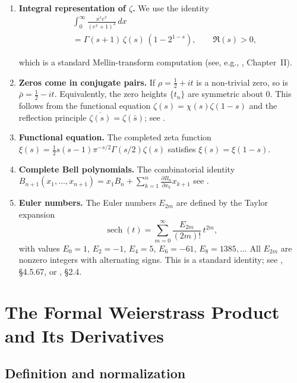 \documentclass[article]{article}
\theoremstyle{plain}
\theoremstyle{definition}
\DeclareMathOperator{\sech}{sech}
\begin{document}
\begin{enumerate}

\item \textbf{Integral representation of $\zeta$.}
We use the identity
\begin{align*}
& \int_0^\infty \frac{x^s e^x}{(e^x+1)^2}\,dx \\
&= \Gamma(s+1)\,\zeta(s)\,(1-2^{1-s}),\qquad \Re(s)>0,
\end{align*}

which is a standard Mellin-transform computation (see, e.g.,
\cite{Titchmarsh1986}, Chapter~II).

\item \textbf{Zeros come in conjugate pairs.}
If $\rho=\tfrac{1}{2}+it$ is a non-trivial zero, so is $\bar\rho=\tfrac{1}{2}-it$.
Equivalently, the zero heights $\{t_n\}$ are symmetric about $0$.
This follows from the functional equation $\zeta(s)=\chi(s)\zeta(1-s)$ and the
reflection principle $\overline{\zeta(s)}=\zeta(\bar s)$; see
\cite{Davenport1980,Titchmarsh1986}.


\item \textbf{Functional equation.}
The completed zeta function $\xi(s)=\tfrac{1}{2}s(s-1)\pi^{-s/2}\Gamma(s/2)\zeta(s)$
satisfies $\xi(s)=\xi(1-s)$.


\item \textbf{Complete Bell polynomials.}
The combinatorial identity
$B_{n+1}(x_1,\ldots,x_{n+1})=x_1 B_n+\sum_{k=1}^n\frac{\partial B_n}{\partial x_k}x_{k+1}$ see
\cite{Bell1934,BellPolynomialsCombo}.


\item \textbf{Euler numbers.}
The Euler numbers $E_{2m}$ are defined by the Taylor expansion
\[
  \sech(t)=\sum_{m=0}^{\infty}\frac{E_{2m}}{(2m)!}\,t^{2m},
\]
with values $E_0=1$, $E_2=-1$, $E_4=5$, $E_6=-61$, $E_8=1385,\ldots$
All $E_{2m}$ are nonzero integers with alternating signs.
This is a standard identity; see \cite{AbramowitzStegun1964}, \S4.5.67, or
\cite{Titchmarsh1986}, \S2.4.

\end{enumerate}

\section{The Formal Weierstrass Product and Its Derivatives}\label{sec:weierstrass}

\subsection{Definition and normalization}
\end{document}
